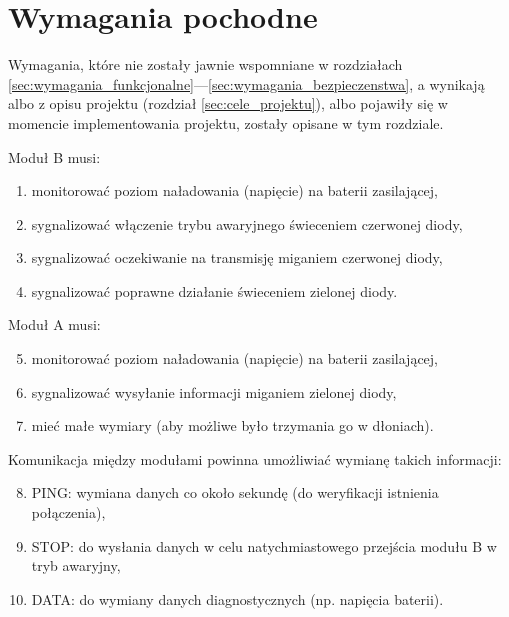 
\section{Wymagania pochodne}
\label{sec:wymagania_pochodne}

Wymagania, które nie zostały jawnie wspomniane w rozdziałach \ref{sec:wymagania_funkcjonalne}—\ref{sec:wymagania_bezpieczenstwa}, a wynikają albo z opisu projektu (rozdział \ref{sec:cele_projektu}), albo pojawiły się w momencie implementowania projektu, zostały opisane w tym rozdziale.

Moduł B musi:

\begin{enumerate}[label=\thesection.\arabic{*}.,leftmargin=4em]
\item \label{wym_poch1} monitorować poziom naładowania (napięcie) na baterii zasilającej,
\item \label{wym_poch2} sygnalizować włączenie trybu awaryjnego świeceniem czerwonej diody,
\item \label{wym_poch3} sygnalizować oczekiwanie na transmisję miganiem czerwonej diody,
\item \label{wym_poch4} sygnalizować poprawne działanie świeceniem zielonej diody.
\end{enumerate}

Moduł A musi:

\begin{enumerate}[label=\thesection.\arabic{*}.,leftmargin=4em]
\setcounter{enumi}{4}
\item \label{wym_poch5} monitorować poziom naładowania (napięcie) na baterii zasilającej,
\item \label{wym_poch6} sygnalizować wysyłanie informacji miganiem zielonej diody,
\item \label{wym_poch7} mieć małe wymiary (aby możliwe było trzymania go w dłoniach).
\end{enumerate}

Komunikacja między modułami powinna umożliwiać wymianę takich informacji:

\begin{enumerate}[label=\thesection.\arabic{*}.,leftmargin=4em]
\setcounter{enumi}{7}
\item \label{wym_poch8} PING: wymiana danych co około sekundę (do weryfikacji istnienia połączenia),
\item \label{wym_poch9} STOP: do wysłania danych w celu natychmiastowego przejścia modułu B w tryb awaryjny,
\item \label{wym_poch10} DATA: do wymiany danych diagnostycznych (np. napięcia baterii).
\end{enumerate}


